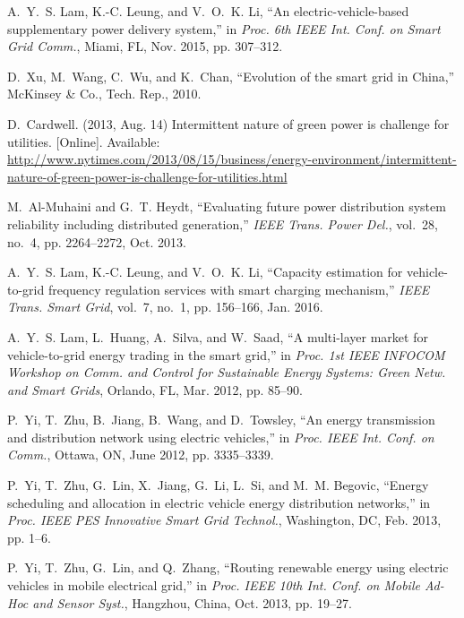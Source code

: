 \documentclass[journal]{IEEEtran}
\begin{document}
\begin{thebibliography}{1}
A.~Y.~S. Lam, K.-C. Leung, and V.~O.~K. Li, ``An electric-vehicle-based
  supplementary power delivery system,'' in \emph{Proc. 6th IEEE Int. Conf. on
  Smart Grid Comm.}, Miami, FL, Nov. 2015, pp. 307--312.

D.~Xu, M.~Wang, C.~Wu, and K.~Chan, ``Evolution of the smart grid in {China},''
  McKinsey \& Co., Tech. Rep., 2010.

D.~Cardwell. (2013, Aug. 14) Intermittent nature of green power is challenge
  for utilities. [Online]. Available:
  \url{http://www.nytimes.com/2013/08/15/business/energy-environment/intermittent-nature-of-green-power-is-challenge-for-utilities.html}


M.~Al-Muhaini and G.~T. Heydt, ``Evaluating future power distribution system
  reliability including distributed generation,'' \emph{{IEEE} Trans. Power
  Del.}, vol.~28, no.~4, pp. 2264--2272, Oct. 2013.

A.~Y.~S. Lam, K.-C. Leung, and V.~O.~K. Li, ``Capacity estimation for
  vehicle-to-grid frequency regulation services with smart charging
  mechanism,'' \emph{{IEEE} Trans. Smart Grid}, vol.~7, no.~1, pp. 156--166,
  Jan. 2016.

A.~Y.~S. Lam, L.~Huang, A.~Silva, and W.~Saad, ``A multi-layer market for
  vehicle-to-grid energy trading in the smart grid,'' in \emph{Proc. 1st IEEE
  INFOCOM Workshop on Comm. and Control for Sustainable Energy Systems: Green
  Netw. and Smart Grids}, Orlando, FL, Mar. 2012, pp. 85--90.

P.~Yi, T.~Zhu, B.~Jiang, B.~Wang, and D.~Towsley, ``An energy transmission and
  distribution network using electric vehicles,'' in \emph{Proc. IEEE Int.
  Conf. on Comm.}, Ottawa, ON, June 2012, pp. 3335--3339.

P.~Yi, T.~Zhu, G.~Lin, X.~Jiang, G.~Li, L.~Si, and M.~M. Begovic, ``Energy
  scheduling and allocation in electric vehicle energy distribution networks,''
  in \emph{Proc. IEEE PES Innovative Smart Grid Technol.}, Washington, DC, Feb.
  2013, pp. 1--6.

P.~Yi, T.~Zhu, G.~Lin, and Q.~Zhang, ``Routing renewable energy using electric
  vehicles in mobile electrical grid,'' in \emph{Proc. IEEE 10th Int. Conf. on
  Mobile Ad-Hoc and Sensor Syst.}, Hangzhou, China, Oct. 2013, pp. 19--27.


\end{thebibliography}
\end{document}

